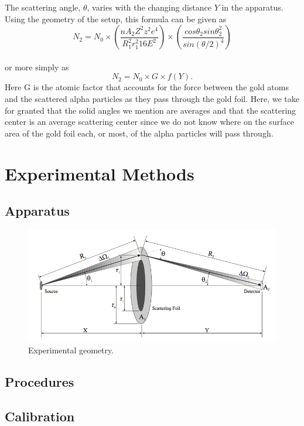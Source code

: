 The scattering angle, $\theta$, varies with the changing distance $Y$ in the apparatus. Using the geometry of the setup, this formula can be given as
\begin{equation} \label{complicated}N_2=N_0\times \left( \frac{nA_2Z^2z^2e^4}{R_1^2r_1^2 16 E^2}\right)\times \left(\frac{cos\theta_2 sin\theta_2^2}{sin(\theta/2)^4}\right) \end {equation}\\or more simply as\begin{equation}  \label{simple}N_2=N_0\times G\times f(Y). \end{equation} Here G is the atomic factor that accounts for the force between the gold atoms and the scattered alpha particles as they pass through the gold foil. Here, we take for granted that the solid angles we mention are averages and that the scattering center is an average scattering center since we do not know where on the surface area of the gold foil each, or most, of the alpha particles will pass through. 
\section{Experimental Methods}
\subsection{Apparatus}
\begin{figure}[H]
\begin{center}
\includegraphics[width=7in]{apparatus.png}
\caption{Experimental geometry.}
\end{center}
\end{figure}
\subsection{Procedures}
\subsection{Calibration}
